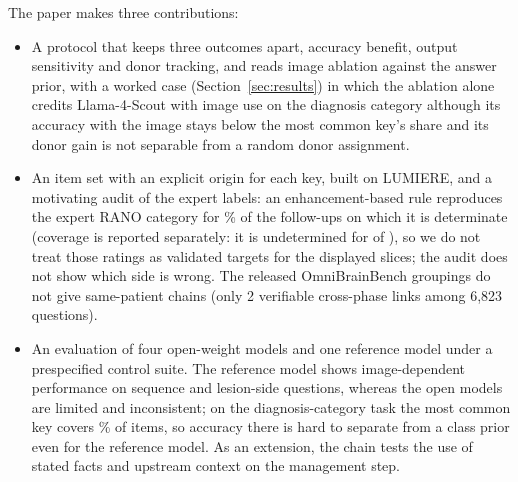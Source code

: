 \documentclass[11pt]{article}
\begin{document}
The paper makes three contributions:
\begin{itemize}[leftmargin=*, itemsep=2pt, topsep=2pt]
    \item A protocol that keeps three outcomes apart, accuracy benefit, output sensitivity and donor tracking, and reads image ablation against the answer prior, with a worked case (Section~\ref{sec:results}) in which the ablation alone credits Llama-4-Scout with image use on the diagnosis category although its accuracy with the image stays below the most common key's share and its donor gain is not separable from a random donor assignment.
    \item An item set with an explicit origin for each key, built on LUMIERE, and a motivating audit of the expert labels: an enhancement-based rule reproduces the expert RANO category for \vfourConcordantDetPct{}\% of the \vfourDeterminate{} follow-ups on which it is determinate (coverage is reported separately: it is undetermined for \vfourUndetermined{} of \vfourFollowups{}), so we do not treat those ratings as validated targets for the displayed slices; the audit does not show which side is wrong. The released OmniBrainBench groupings do not give same-patient chains (only 2 verifiable cross-phase links among 6,823 questions).
    \item An evaluation of four open-weight models and one reference model under a prespecified control suite. The reference model shows image-dependent performance on sequence and lesion-side questions, whereas the open models are limited and inconsistent; on the diagnosis-category task the most common key covers \vfourMajorityDSCR{}\% of items, so accuracy there is hard to separate from a class prior even for the reference model. As an extension, the chain tests the use of stated facts and upstream context on the management step.
\end{itemize}
\end{document}
